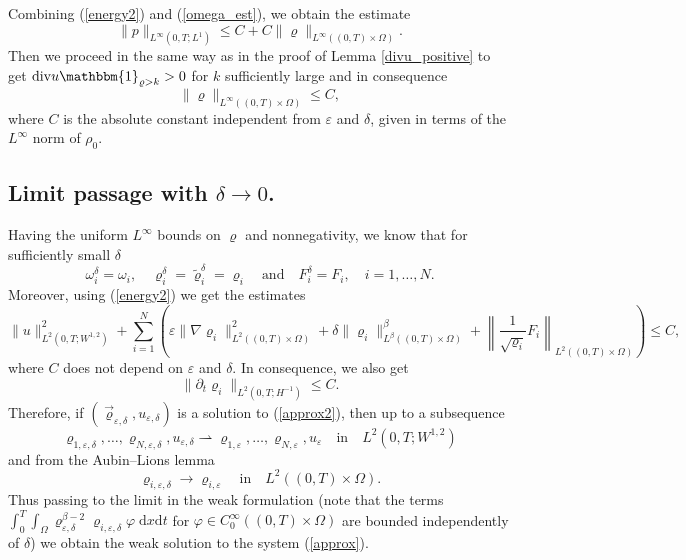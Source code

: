 \documentclass[11pt]{article}
\newcommand{\dd}{\mathrm{d}}
\renewcommand{\div}{\mathrm{div}}
\numberwithin{equation}{section}
\numberwithin{tw}{section}
\begin{document}
Combining (\ref{energy2}) and (\ref{omega_est}), we obtain the estimate
\[ \|p\|_{L^\infty(0,T;L^1)} \leq C+C\|\varrho\|_{L^\infty((0,T)\times\Omega)}. \]
Then we proceed in the same way as in the proof of Lemma \ref{divu_positive} to get $\div u\mathbbm{1}_{\varrho>k}> 0$ for $k$ sufficiently large and in consequence
\[ \|\varrho\|_{L^\infty((0,T)\times\Omega)}\leq C,\]
where $C$ is the absolute constant independent from $\varepsilon$ and $\delta$, given in terms of the $L^\infty$
norm of $\rho_0$.

\subsection{Limit passage with $\delta\to 0$.}
Having the uniform $L^\infty$ bounds on $\varrho$ and nonnegativity, we know that for sufficiently small $\delta$
\[ \omega_i^\delta = \omega_i, \quad \varrho_i^\delta=\tilde\varrho_i^\delta=\varrho_i \quad \text{and} \quad F_i^\delta=F_i, \quad i=1,\dots,N. \]
Moreover, using (\ref{energy2}) we get the estimates
\[ \|u\|_{L^2(0,T;W^{1,2})}^2 + \sum_{i=1}^N\left(\varepsilon\|\nabla\varrho_{i}\|_{L^2((0,T)\times\Omega)}^2+\delta\|\varrho_{i}\|_{L^\beta((0,T)\times\Omega)}^\beta + \left\|\frac{1}{\sqrt{\varrho_i}}F_i\right\|_{L^2((0,T)\times\Omega)}\right)
\leq C, \]
where $C$ does not depend on $\varepsilon$ and $\delta$. In consequence, we also get
\[ \|\partial_t\varrho_i\|_{L^2(0,T;H^{-1})} \leq C. \]
Therefore, if $(\vec\varrho_{\varepsilon,\delta}, u_{\varepsilon,\delta})$ is a solution to (\ref{approx2}), then up to a subsequence
\[ \varrho_{1,\varepsilon,\delta},\dots,\varrho_{N,\varepsilon,\delta}, u_{\varepsilon,\delta} \rightharpoonup \varrho_{1,\varepsilon},\dots,\varrho_{N,\varepsilon}, u_\varepsilon \quad \text{in} \quad L^2(0,T;W^{1,2}) \]
and from the Aubin--Lions lemma
\[ \varrho_{i,\varepsilon,\delta} \to \varrho_{i,\varepsilon} \quad \text{in} \quad L^2((0,T)\times\Omega). \]
Thus passing to the limit in the weak formulation (note that the terms $\int_0^T\int_\Omega \varrho_{\varepsilon,\delta}^{\beta-2}\varrho_{i,\varepsilon,\delta}\varphi \;\dd x\dd t$ for $\varphi\in C_0^\infty((0,T)\times\Omega)$ are bounded independently of $\delta$) we obtain the weak solution to the system (\ref{approx}).


\end{document}
